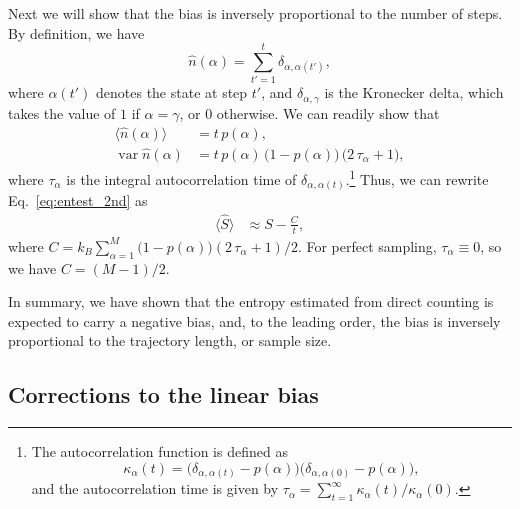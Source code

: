 \documentclass[reprint, superscriptaddress]{revtex4-1}
\begin{document}
Next we will show that the bias is inversely proportional
to the number of steps.
%
By definition, we have
%
\begin{equation*}
  \hat{n}(\alpha) = \sum_{t' = 1}^t \delta_{\alpha, \alpha(t')},
\end{equation*}
%
where $\alpha(t')$ denotes the state at step $t'$,
and $\delta_{\alpha, \gamma}$ is the Kronecker delta,
which takes the value of $1$ if $\alpha = \gamma$, or $0$ otherwise.
%
We can readily show that
\begin{align*}
  \bigl\langle \hat{n}(\alpha) \bigr\rangle
  &=
  t \, p(\alpha), \\
  \operatorname{var}{\hat{n}(\alpha)}
  &=
  t \, p(\alpha) \, \bigl( 1 - p(\alpha) \bigr) \, \bigl(2 \, \tau_\alpha + 1\bigr)
  ,
\end{align*}
%
where $\tau_\alpha$ is the integral autocorrelation time of $\delta_{\alpha, \alpha(t)}$.\footnote{
The autocorrelation function is defined as
$$
\kappa_\alpha(t) = \bigl(\delta_{\alpha, \alpha(t)} - p(\alpha)\bigr)
\bigl(\delta_{\alpha, \alpha(0)} - p(\alpha)\bigr),
$$
and the autocorrelation time is given by
$\tau_\alpha = \sum_{t = 1}^\infty \kappa_\alpha(t)/\kappa_\alpha(0)$.
}
%
Thus, we can rewrite Eq.~\eqref{eq:entest_2nd} as
%
\begin{align}
  \bigl\langle \hat S \bigr\rangle
  &\approx
  S - \frac{ C } { t }
  ,
  \label{eq:Shat_ave}
\end{align}
%
where $C = k_B \sum_{\alpha = 1}^M
    \bigl(1 - p(\alpha)\bigr) ( 2 \, \tau_\alpha + 1)/2$.
%
For perfect sampling, $\tau_\alpha \equiv 0$, so we have $C = (M-1)/2$.

In summary, we have shown that the entropy estimated
from direct counting
is expected to carry a negative bias,
and, to the leading order, the bias is
inversely proportional to the trajectory length,
or sample size.



\subsection{Corrections to the linear bias}
\end{document}
